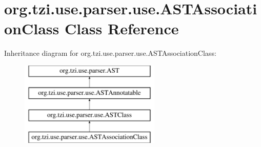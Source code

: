 \hypertarget{classorg_1_1tzi_1_1use_1_1parser_1_1use_1_1_a_s_t_association_class}{\section{org.\-tzi.\-use.\-parser.\-use.\-A\-S\-T\-Association\-Class Class Reference}
\label{classorg_1_1tzi_1_1use_1_1parser_1_1use_1_1_a_s_t_association_class}
}
Inheritance diagram for org.\-tzi.\-use.\-parser.\-use.\-A\-S\-T\-Association\-Class\-:\begin{figure}[H]
\begin{center}
\leavevmode
\includegraphics[height=4.000000cm]{classorg_1_1tzi_1_1use_1_1parser_1_1use_1_1_a_s_t_association_class}
\end{center}
\end{figure}
